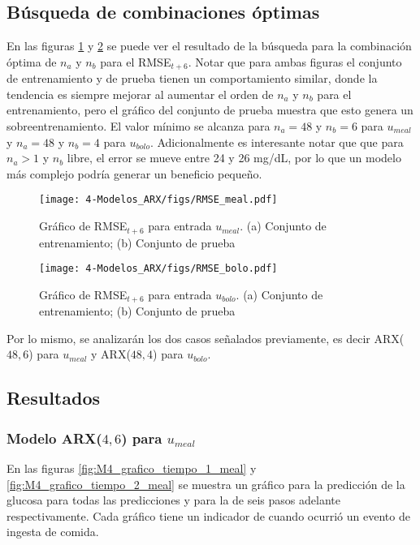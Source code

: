 \subsection{Búsqueda de combinaciones óptimas}

En las figuras \ref{fig:M4_RMSE_meal} y \ref{fig:M4_RMSE_bolo} se puede ver el resultado de la búsqueda para la combinación óptima de $n_a$ y $n_b$ para el RMSE$_{t+6}$. Notar que para ambas figuras el conjunto de entrenamiento y de prueba tienen un comportamiento similar, donde la tendencia es siempre mejorar al aumentar el orden de $n_a$ y $n_b$ para el entrenamiento, pero el gráfico del conjunto de prueba muestra que esto genera un sobreentrenamiento. El valor mínimo se alcanza para $n_a=48$ y $n_b=6$ para $u_{meal}$ y $n_a=48$ y $n_b=4$ para $u_{bolo}$. Adicionalmente es interesante notar que que para $n_a > 1$ y $n_b$ libre, el error se mueve entre 24 y 26 mg/dL, por lo que un modelo más complejo podría generar un beneficio pequeño.

\begin{figure}[H]
	\centering
	\texttt{[image: 4-Modelos\_ARX/figs/RMSE\_meal.pdf]}
	\caption{Gráfico de RMSE$_{t+6}$ para entrada $u_{meal}$. (a) Conjunto de entrenamiento; (b) Conjunto de prueba}
	\label{fig:M4_RMSE_meal}
\end{figure}

\begin{figure}[H]
	\centering
	\texttt{[image: 4-Modelos\_ARX/figs/RMSE\_bolo.pdf]}
	\caption{Gráfico de RMSE$_{t+6}$ para entrada $u_{bolo}$. (a) Conjunto de entrenamiento; (b) Conjunto de prueba}
	\label{fig:M4_RMSE_bolo}
\end{figure}

Por lo mismo, se analizarán los dos casos señalados previamente, es decir ARX($48,6$) para $u_{meal}$ y ARX($48,4$) para $u_{bolo}$.


\subsection{Resultados}

\subsubsection{Modelo ARX($4,6$) para $u_{meal}$}

En las figuras \ref{fig:M4_grafico_tiempo_1_meal} y \ref{fig:M4_grafico_tiempo_2_meal} se muestra un gráfico para la predicción de la glucosa para todas las predicciones y para la de seis pasos adelante respectivamente. Cada gráfico tiene un indicador de cuando ocurrió un evento de ingesta de comida.

